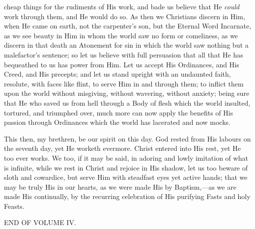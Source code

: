 cheap things for the rudiments of His work, and bade us believe that
He \emph{could} work through them, and He would do so. As then we
Christians discern in Him, when He came on earth, not the carpenter's
son, but the Eternal Word Incarnate, as we see beauty in Him in whom
the world saw no form or comeliness, as we discern in that death an
Atonement for sin in which the world saw nothing but a malefactor's
sentence; so let us believe with full persuasion that all that He has
bequeathed to us has power from Him. Let us accept His Ordinances, and
His Creed, and His precepts; and let us stand upright with an
undaunted faith, resolute, with faces like flint, to serve Him in and
through them; to inflict them upon the world without misgiving,
without wavering, without anxiety; being sure that He who saved us
from hell through a Body of flesh which the world insulted, tortured,
and triumphed over, much more can now apply the benefits of His
passion through Ordinances which the world has lacerated and now
mocks.

This then, my brethren, be our spirit on this day. God rested from
His labours on the seventh day, yet He worketh evermore. Christ
entered into His rest, yet He too ever works. We too, if it may be
said, in adoring and lowly imitation of what is infinite, while we
rest in Christ and rejoice in His shadow, let us too beware of sloth
and cowardice, but serve Him with steadfast eyes yet active hands;
that we may be truly His in our hearts, as we were made His by
Baptism,—as we are made His continually, by the recurring
celebration of His purifying Fasts and holy Feasts.

END OF VOLUME IV.
